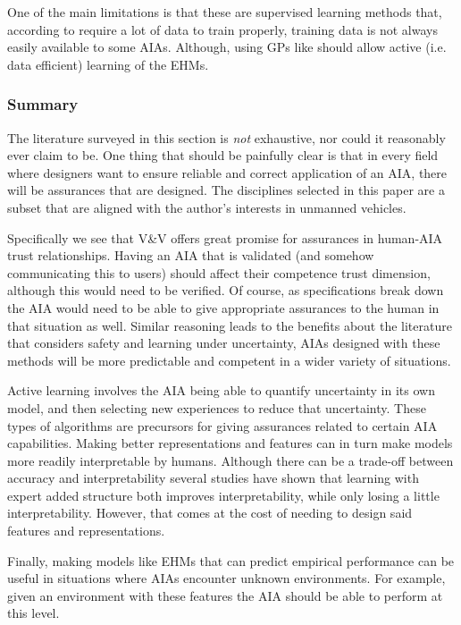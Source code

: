     One of the main limitations is that these are supervised learning methods that, according to \cite{Leyton-Brown2009-yr} require a lot of data to train properly, training data is not always easily available to some AIAs. Although, using GPs like \cite{Hutter2006-ak} should allow active (i.e. data efficient) learning of the EHMs.

\subsubsection{Summary}
    The literature surveyed in this section is \emph{not} exhaustive, nor could it reasonably ever claim to be. One thing that should be painfully clear is that in every field where designers want to ensure reliable and correct application of an AIA, there will be assurances that are designed. The disciplines selected in this paper are a subset that are aligned with the author's interests in unmanned vehicles.
    
    Specifically we see that V\&V offers great promise for assurances in human-AIA trust relationships. Having an AIA that is validated (and somehow communicating this to users) should affect their competence trust dimension, although this would need to be verified. Of course, as specifications break down the AIA would need to be able to give appropriate assurances to the human in that situation as well. Similar reasoning leads to the benefits about the literature that considers safety and learning under uncertainty, AIAs designed with these methods will be more predictable and competent in a wider variety of situations.

    Active learning involves the AIA being able to quantify uncertainty in its own model, and then selecting new experiences to reduce that uncertainty. These types of algorithms are precursors for giving assurances related to certain AIA capabilities. Making better representations and features can in turn make models more readily interpretable by humans. Although there can be a trade-off between accuracy and interpretability several studies have shown that learning with expert added structure both improves interpretability, while only losing a little interpretability. However, that comes at the cost of needing to design said features and representations.

    Finally, making models like EHMs that can predict empirical performance can be useful in situations where AIAs encounter unknown environments. For example, given an environment with these features the AIA should be able to perform at this level. 
